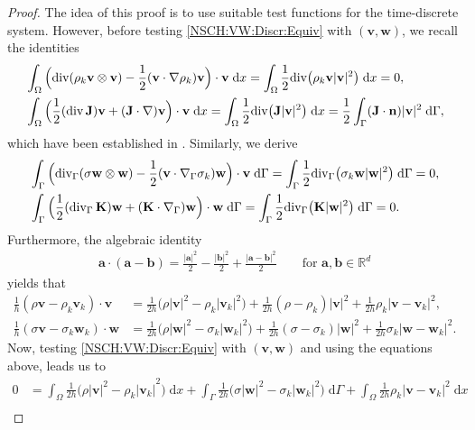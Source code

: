 \documentclass[11pt,reqno]{amsart}
\theoremstyle{remark}
\numberwithin{equation}{section}
\newcommand{\abs}[1]{|#1|}
\newcommand{\R}{\mathbb R}
\newcommand{\n}{\mathbf{n}}
\newcommand{\intO}{\int_\Omega}
\newcommand{\intG}{\int_\Gamma}
\newcommand{\dx}{\;\mathrm{d}x}
\newcommand{\dG}{\;\mathrm d\Ga}
\newcommand{\Grad}{\nabla}
\newcommand{\Div}{\textnormal{div}}
\newcommand{\Gradg}{\nabla_\Ga}
\newcommand{\Divg}{\textnormal{div}_\Ga}
\newcommand{\Ga}{\Gamma}
\newcommand{\J}{\mathbf J}
\newcommand{\K}{\mathbf K}
\newcommand{\bv}{\mathbf v}
\newcommand{\bw}{\mathbf w}
\begin{document}
\begin{proof}
    The idea of this proof is to use suitable test functions for the time-discrete system.  However, before testing \eqref{NSCH:VW:Discr:Equiv} with $(\bv,\bw)$, we recall the identities
    \begin{align*}
        &\intO \Big(\Div(\rho_k\bv\otimes\bv) - \frac12(\bv\cdot\Grad\rho_k)\bv\Big)\cdot\bv\dx = \intO \frac12\Div\big(\rho_k\bv\abs{\bv}^2\big)\dx = 0, \\
        &\intO\Big(\frac12(\Div\,\J)\bv + (\J\cdot\Grad)\bv\Big)\cdot\bv \dx = \intO \frac12\Div\big(\J\abs{\bv}^2\big)\dx = \frac12\intG (\J\cdot\n)\abs{\bv}^2\dG,
    \end{align*}
    which have been established in \cite[Lemma 4.3]{Abels2013}. Similarly, we derive
    \begin{align*}
        &\intG \Big(\Divg(\sigma\bw\otimes\bw) - \frac12(\bv\cdot\Gradg\sigma_k)\bw\Big)\cdot\bv\dG = \intG \frac12\Divg\big(\sigma_k\bw\abs{\bw}^2\big)\dG = 0, \\
        &\intG \Big(\frac12(\Divg\,\K)\bw + (\K\cdot\Gradg)\bw\Big)\cdot\bw\dG = \intG \frac12\Divg\big(\K\abs{\bw}^2\big)\dG = 0.
    \end{align*}
    Furthermore, the algebraic identity
    \begin{align*}
        \mathbf{a}\cdot(\mathbf{a}-\mathbf{b}) = \frac{\abs{\mathbf{a}}^2}{2} - \frac{\abs{\mathbf{b}}^2}{2} + \frac{\abs{\mathbf{a} - \mathbf{b}}^2}{2} \qquad\text{for~}\mathbf{a},\mathbf{b}\in\R^d
    \end{align*}
    yields that
    \begin{align*}
        \frac1h(\rho\bv - \rho_k\bv_k)\cdot\bv &= \frac{1}{2h}\Big(\rho\abs{\bv}^2 - \rho_k\abs{\bv_k}^2\Big) + \frac{1}{2h} (\rho - \rho_k)\abs{\bv}^2 + \frac{1}{2h}\rho_k\abs{\bv - \bv_k}^2, \\
        \frac1h(\sigma\bv - \sigma_k\bw_k)\cdot\bw &= \frac{1}{2h}\Big(\rho\abs{\bw}^2 - \sigma_k\abs{\bw_k}^2\Big) + \frac{1}{2h}(\sigma - \sigma_k)\abs{\bw}^2 + \frac{1}{2h} \sigma_k\abs{\bw - \bw_k}^2.
    \end{align*}
    Now, testing \eqref{NSCH:VW:Discr:Equiv} with $(\bv,\bw)$ and using the equations above, leads us to 
    \begin{align*}
        0 &= \intO \frac{1}{2h}\Big(\rho{\abs{\bv}^2 - \rho_k\abs{\bv_k}}^2\Big)\dx + \intG \frac{1}{2h}\Big(\sigma\abs{\bw}^2 - \sigma_k\abs{\bw_k}^2\Big)\dG + \intO \frac{1}{2h} \rho_k\abs{\bv - \bv_k}^2\dx \nonumber \\

\end{align*}
\end{proof}
\end{document}
